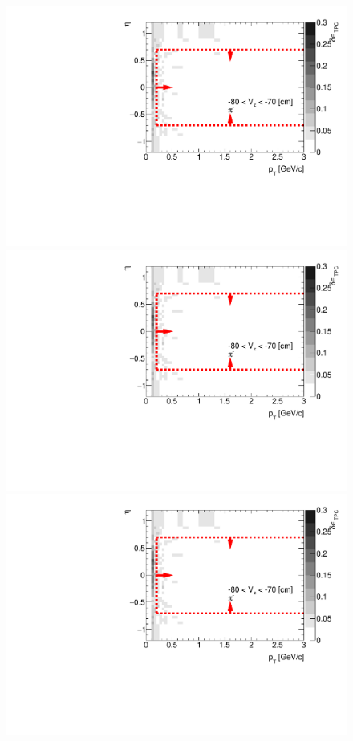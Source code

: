 \begin{figure}[H]
{	}~
	\parbox{0.325\textwidth}{
		\includegraphics[width=\linewidth,page=50]{graphics/systematicsEfficiency/deadMaterial/secondaries_Unbinned_SD_.pdf}\\
		\includegraphics[width=\linewidth,page=53]{graphics/systematicsEfficiency/deadMaterial/secondaries_Unbinned_SD_.pdf}\\
		\includegraphics[width=\linewidth,page=56]{graphics/systematicsEfficiency/deadMaterial/secondaries_Unbinned_SD_.pdf}\\
}
\end{figure}
